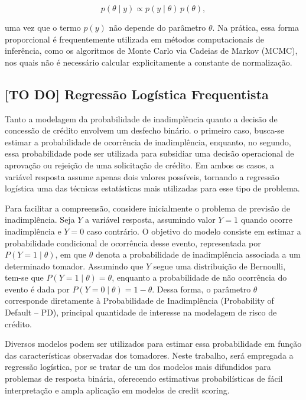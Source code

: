 \documentclass[
  brazilian,
  12pt,
  letterpaper,
  DIV=11,
  numbers=noendperiod]{scrartcl}
\begin{document}
\begin{equation}
p(\theta \mid y) \propto p(y \mid \theta)\,p(\theta),
\label{eq:posterior_prop}
\end{equation}

uma vez que o termo \(p(y)\) não depende do parâmetro \(\theta\). Na
prática, essa forma proporcional é frequentemente utilizada em métodos
computacionais de inferência, como os algoritmos de Monte Carlo via
Cadeias de Markov (MCMC), nos quais não é necessário calcular
explicitamente a constante de normalização.

\subsection{{[}TO DO{]} Regressão Logística
Frequentista}\label{to-do-regressuxe3o-loguxedstica-frequentista}

Tanto a modelagem da probabilidade de inadimplência quanto a decisão de
concessão de crédito envolvem um desfecho binário. o primeiro caso,
busca-se estimar a probabilidade de ocorrência de inadimplência,
enquanto, no segundo, essa probabilidade pode ser utilizada para
subsidiar uma decisão operacional de aprovação ou rejeição de uma
solicitação de crédito. Em ambos os casos, a variável resposta assume
apenas dois valores possíveis, tornando a regressão logística uma das
técnicas estatísticas mais utilizadas para esse tipo de problema.

Para facilitar a compreensão, considere inicialmente o problema de
previsão de inadimplência. Seja \(Y\) a variável resposta, assumindo
valor \(Y = 1\) quando ocorre inadimplência e \(Y = 0\) caso contrário.
O objetivo do modelo consiste em estimar a probabilidade condicional de
ocorrência desse evento, representada por \(P(Y = 1 \mid \theta)\), em
que \(\theta\) denota a probabilidade de inadimplência associada a um
determinado tomador. Assumindo que \(Y\) segue uma distribuição de
Bernoulli, tem-se que \(P(Y = 1 \mid \theta) = \theta\), enquanto a
probabilidade de não ocorrência do evento é dada por
\(P(Y = 0 \mid \theta) = 1 - \theta\). Dessa forma, o parâmetro
\(\theta\) corresponde diretamente à Probabilidade de Inadimplência
(Probability of Default -- PD), principal quantidade de interesse na
modelagem de risco de crédito.

Diversos modelos podem ser utilizados para estimar essa probabilidade em
função das características observadas dos tomadores. Neste trabalho,
será empregada a regressão logística, por se tratar de um dos modelos
mais difundidos para problemas de resposta binária, oferecendo
estimativas probabilísticas de fácil interpretação e ampla aplicação em
modelos de credit scoring.
\end{document}
